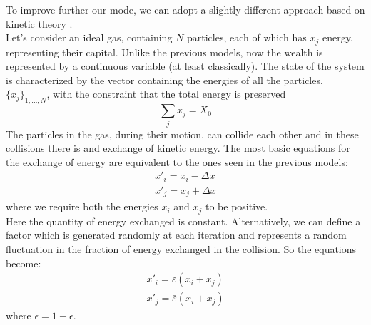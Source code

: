 To improve further our mode, we can adopt a slightly different approach based on kinetic theory \cite{econophysics}. \\
Let's consider an ideal gas, containing $N$ particles, each of which has $x_j$ energy, representing their capital.
Unlike the previous models, now the wealth is represented by a continuous variable (at least classically).
The state of the system is characterized by the vector containing the energies of all the particles, $\{x_j\}_{1,\ldots,N}$, with the constraint that the total energy is preserved
\begin{equation}
	\sum_j x_j = X_0
\end{equation}
The particles in the gas, during their motion, can collide each other and in these collisions there is and exchange of kinetic energy.
The most basic equations for the exchange of energy are equivalent to the ones seen in the previous models:
\begin{equation}
	\begin{split}
		x'_i = x_i - \Delta x \\
		x'_j = x_j + \Delta x 
	\end{split}
\end{equation}
where we require both the energies $x_i$ and $x_j$ to be positive. \\
Here the quantity of energy exchanged is constant.
Alternatively, we can define a factor which is generated randomly at each iteration and represents a random fluctuation in the fraction of energy exchanged in the collision.
So the equations become:
\begin{equation}
	\begin{split}
		x'_i = \varepsilon(x_i + x_j)	 \\
		x'_j = \bar{\varepsilon}(x_i + x_j)
	\end{split}
\end{equation}
where $\bar{\epsilon} = 1 - \epsilon$. \\

